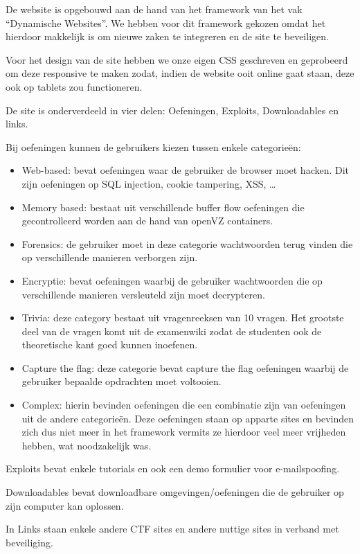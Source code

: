De website is opgebouwd aan de hand van het framework van het vak ``Dynamische Websites''. We hebben voor dit framework gekozen omdat het hierdoor makkelijk is om nieuwe zaken te integreren en de site te beveiligen.

Voor het design van de site hebben we onze eigen CSS geschreven en geprobeerd om deze responsive te maken zodat, indien de website ooit online gaat staan, deze ook op tablets zou functioneren.

De site is onderverdeeld in vier delen: Oefeningen, Exploits, Downloadables en links.

Bij oefeningen kunnen de gebruikers kiezen tussen enkele categorieën:
\begin{itemize}
\item Web-based: bevat oefeningen waar de gebruiker de browser moet hacken. Dit zijn oefeningen op SQL injection, cookie tampering, XSS, \ldots
\item Memory based: bestaat uit verschillende buffer flow oefeningen die gecontrolleerd worden aan de hand van openVZ containers.
\item Forensics: de gebruiker moet in deze categorie wachtwoorden terug vinden die op verschillende manieren verborgen zijn.
\item Encryptie: bevat oefeningen waarbij de gebruiker wachtwoorden die op verschillende manieren versleuteld zijn moet decrypteren.
\item Trivia: deze category bestaat uit vragenreeksen van 10 vragen. Het grootste deel van de vragen komt uit de examenwiki zodat de studenten ook de theoretische kant goed kunnen inoefenen.
\item Capture the flag: deze categorie bevat capture the flag oefeningen waarbij de gebruiker bepaalde opdrachten moet voltooien.
\item Complex: hierin bevinden oefeningen die een combinatie zijn van oefeningen uit de andere categorieën. Deze oefeningen staan op apparte sites en bevinden zich dus niet meer in het framework vermits ze hierdoor veel meer vrijheden hebben, wat noodzakelijk was.
\end{itemize}

Exploits bevat enkele tutorials en ook een demo formulier voor e-mailspoofing.

Downloadables bevat downloadbare omgevingen/oefeningen die de gebruiker op zijn computer kan oplossen.

In Links staan enkele andere CTF sites en andere nuttige sites in verband met beveiliging.

